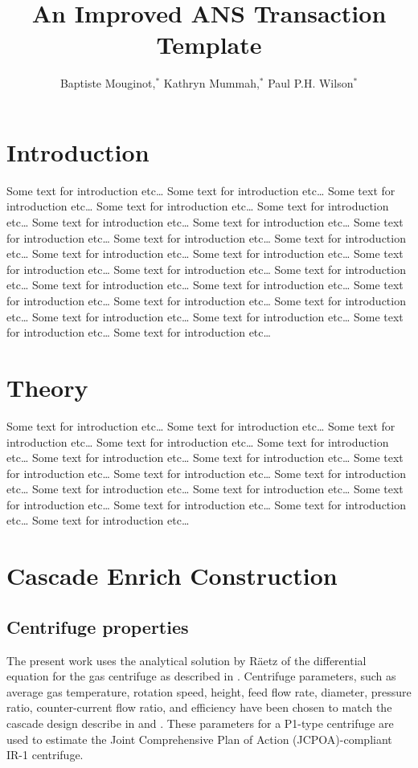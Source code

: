 \documentclass{anstrans}
\title{An Improved ANS Transaction Template}
\author{Baptiste Mouginot,$^{*}$ Kathryn Mummah,$^{*}$ Paul P.H. Wilson$^{*}$}
\institute{
$^{*}$University of Wisconsin-Madison, WI
}
\begin{document}
\section{Introduction}




Some text for introduction etc\ldots
Some text for introduction etc\ldots
Some text for introduction etc\ldots
Some text for introduction etc\ldots
Some text for introduction etc\ldots
Some text for introduction etc\ldots
Some text for introduction etc\ldots
Some text for introduction etc\ldots
Some text for introduction etc\ldots
Some text for introduction etc\ldots
Some text for introduction etc\ldots
Some text for introduction etc\ldots
Some text for introduction etc\ldots
Some text for introduction etc\ldots
Some text for introduction etc\ldots
Some text for introduction etc\ldots
Some text for introduction etc\ldots
Some text for introduction etc\ldots
Some text for introduction etc\ldots
Some text for introduction etc\ldots
Some text for introduction etc\ldots
Some text for introduction etc\ldots
Some text for introduction etc\ldots
Some text for introduction etc\ldots


\section{Theory}



Some text for introduction etc\ldots
Some text for introduction etc\ldots
Some text for introduction etc\ldots
Some text for introduction etc\ldots
Some text for introduction etc\ldots
Some text for introduction etc\ldots
Some text for introduction etc\ldots
Some text for introduction etc\ldots
Some text for introduction etc\ldots
Some text for introduction etc\ldots
Some text for introduction etc\ldots
Some text for introduction etc\ldots
Some text for introduction etc\ldots
Some text for introduction etc\ldots
Some text for introduction etc\ldots
Some text for introduction etc\ldots


\section{Cascade Enrich Construction}
\subsection{Centrifuge properties}
The present work uses the analytical solution by R\"aetz \cite{ref} of the
differential equation for the gas centrifuge as described in \cite{Glaser2008}. Centrifuge parameters, such as average gas temperature, rotation speed, height, feed flow rate, diameter, pressure ratio,
counter-current flow ratio, and efficiency have been chosen to match the cascade design
describe in \cite{glaser2008} and \cite{Walker2017}. These parameters for a P1-type centrifuge are used to estimate the Joint Comprehensive Plan of Action (JCPOA)-compliant IR-1 centrifuge.
\end{document}
